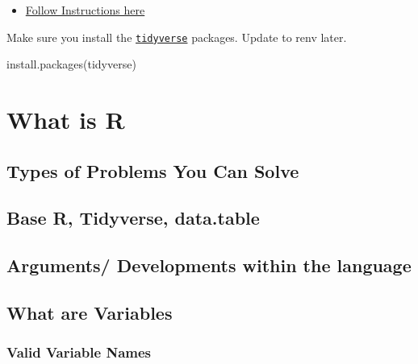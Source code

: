 \documentclass[
]{book}
\newenvironment{Shaded}{\begin{snugshade}}{\end{snugshade}}
\newcommand{\FunctionTok}[1]{\textcolor[rgb]{0.00,0.00,0.00}{#1}}
\newcommand{\NormalTok}[1]{#1}
\newcommand{\StringTok}[1]{\textcolor[rgb]{0.31,0.60,0.02}{#1}}
\providecommand{\tightlist}{%
  \setlength{\itemsep}{0pt}\setlength{\parskip}{0pt}}
\begin{document}
\begin{itemize}
  \begin{itemize}
  \tightlist
  \item
    \href{https://towardsdatascience.com/how-to-use-the-reddit-api-in-python-5e05ddfd1e5c}{Follow Instructions here}
  \end{itemize}
\end{itemize}

Make sure you install the \href{https://www.tidyverse.org/}{\texttt{tidyverse}} packages. Update to renv later.

\begin{Shaded}
\begin{Highlighting}[]
\FunctionTok{install.packages}\NormalTok{(}\StringTok{\textquotesingle{}tidyverse\textquotesingle{}}\NormalTok{)}
\end{Highlighting}
\end{Shaded}

\hypertarget{what-is-r}{%
\chapter{What is R}\label{what-is-r}}

\hypertarget{types-of-problems-you-can-solve}{%
\section{Types of Problems You Can Solve}\label{types-of-problems-you-can-solve}}

\hypertarget{base-r-tidyverse-data.table}{%
\section{Base R, Tidyverse, data.table}\label{base-r-tidyverse-data.table}}

\hypertarget{arguments-developments-within-the-language}{%
\section{Arguments/ Developments within the language}\label{arguments-developments-within-the-language}}

\hypertarget{what-are-variables}{%
\section{What are Variables}\label{what-are-variables}}

\hypertarget{valid-variable-names}{%
\subsection{Valid Variable Names}\label{valid-variable-names}}
\end{document}
